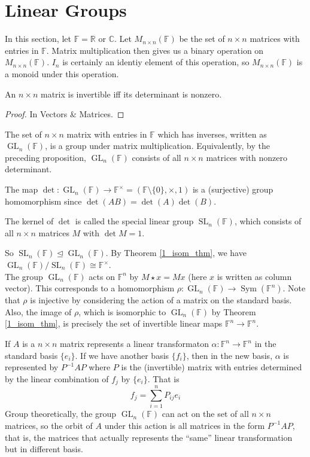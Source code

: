 \section{Linear Groups}
In this section, let $\mathbb F=\mathbb R$ or $\mathbb C$.
Let $M_{n\times n}(\mathbb F)$ be the set of $n\times n$ matrices with entries in $\mathbb F$.
Matrix multiplication then gives us a binary operation on $M_{n\times n}(\mathbb F)$.
$I_n$ is certainly an identiy element of this operation, so $M_{n\times n}(\mathbb F)$ is a monoid under this operation.
\begin{proposition}
    An $n\times n$ matrix is invertible iff its determinant is nonzero.
\end{proposition}
\begin{proof}
    In Vectors \& Matrices.
\end{proof}
\begin{definition}
    The set of $n\times n$ matrix with entries in $\mathbb F$ which has inverses, written as $\operatorname{GL}_n(\mathbb F)$, is a group under matrix multiplication.
    Equivalently, by the preceding proposition, $\operatorname{GL}_n(\mathbb F)$ consists of all $n\times n$ matrices with nonzero determinant.
\end{definition}
The map $\det:\operatorname{GL}_n(\mathbb F)\to\mathbb F^\times=(\mathbb F\setminus\{0\},\times,1)$ is a (surjective) group homomorphism since $\det(AB)=\det(A)\det(B)$.
\begin{definition}
    The kernel of $\det$ is called the special linear group $\operatorname{SL}_n(\mathbb F)$, which consists of all $n\times n$ matrices $M$ with $\det M=1$.
\end{definition}
So $\operatorname{SL}_n(\mathbb F)\unlhd\operatorname{GL}_n(\mathbb F)$.
By Theorem \ref{1_isom_thm}, we have $\operatorname{GL}_n(\mathbb F)/\operatorname{SL}_n(\mathbb F)\cong\mathbb F^\times$.\\
The group $\operatorname{GL}_n(\mathbb F)$ acts on $\mathbb F^n$ by $M\star x=Mx$ (here $x$ is written as column vector).
This corresponds to a homomorphism $\rho:\operatorname{GL}_n(\mathbb F)\to\operatorname{Sym}(\mathbb F^n)$.
Note that $\rho$ is injective by considering the action of a matrix on the standard basis.
Also, the image of $\rho$, which is isomorphic to $\operatorname{GL}_n(\mathbb F)$ by Theorem \ref{1_isom_thm}, is precisely the set of invertible linear maps $\mathbb F^n\to\mathbb F^n$.
\begin{proposition}
    If $A$ is a $n\times n$ matrix represents a linear transformaton $\alpha:\mathbb F^n\to\mathbb F^n$ in the standard basis $\{e_i\}$.
    If we have another basis $\{f_i\}$, then in the new basis, $\alpha$ is represented by $P^{-1}AP$ where $P$ is the (invertible) matrix with entries determined by the linear combination of $f_j$ by $\{e_i\}$.
    That is
    $$f_j=\sum_{i=1}^nP_{ij}e_i$$
    Group theoretically, the group $\operatorname{GL}_n(\mathbb F)$ can act on the set of all $n\times n$ matrices, so the orbit of $A$ under this action is all matrices in the form $P^{-1}AP$, that is, the matrices that actually represents the ``same'' linear transformation but in different basis.
\end{proposition}
